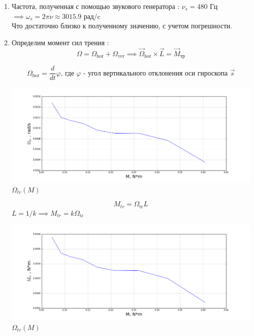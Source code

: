 \documentclass[8pt]{article}
\begin{document}
\begin{enumerate}
\begin{center}
        $y = kx + b$ , $k \approx 0.39$  , $b \approx 0.014$ , $\sigma_k \approx 0.023$ , $\sigma_b \approx 0.002$\\
        
    \end{center}

    Из (\ref{main}) получим : 
    $$\omega_0 = \frac{M}{I_0\Omega} = \frac{1}{k I_0} \approx 3.4 \cdot 10^3 \text{ рад/c}$$ 
    $$\sigma_{\omega_0} = \omega_0 \sqrt{\left(\frac{\sigma_{\tg\alpha}}{\tg\alpha}\right)^2
    + \left(\frac{\sigma_{I_0}}{I_0}\right)^2} \approx 0.2 \cdot 10^3 \text{рад/c} $$

    \item
    Частота, полученная с помощью звукового генератора : $\nu_{s} = 480$ Гц $\implies \omega_{s} = 2\pi\nu \approx 3015.9 \text{ рад/c}$\\
    Что достаточно близко к полученному значению, с учетом погрешности.

    \item Определим момент сил трения :
    \begin{equation}
        \Omega = \Omega_\text{hor} + \Omega_\text{ver} \implies
        \vec{\Omega}_\text{hor} \times \vec{L} = \vec{M}_\text{тр}
    \end{equation}

    $$\Omega_\text{hor} = \frac{d}{dt} \varphi \text{, где }  \varphi \text{ - угол вертикального отклонения оси гироскопа } \vec{s} $$ 
    
    \begin{center} 
        \includegraphics[width=6.5in]{graph2.png} \\ $\Omega_{tr}(M)$ 
    \end{center}

    $$M_{tr} = \Omega_\text{tr} L$$
    $L = 1 / k \implies M_{tr} = k\Omega_\text{tr}$

    \begin{center} 
        \includegraphics[width=6.5in]{graph3.png} \\ $\Omega_{tr}(M)$ 
    \end{center}


\end{enumerate}
\end{document}
